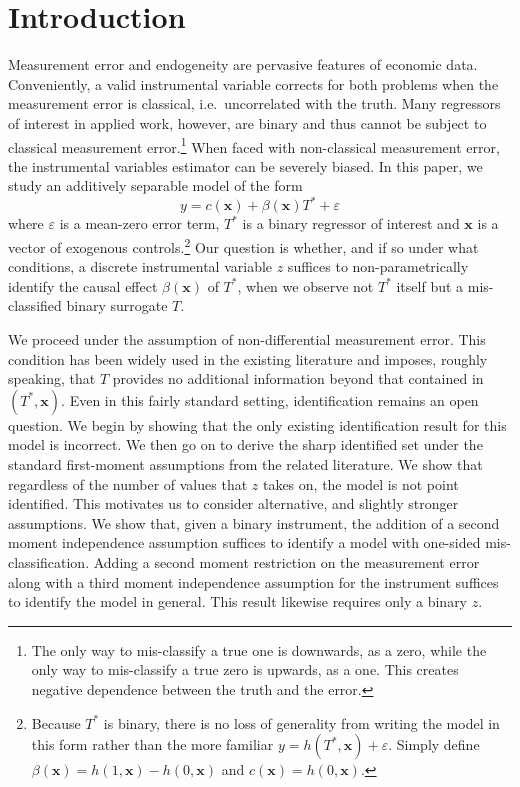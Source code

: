 \section{Introduction}

Measurement error and endogeneity are pervasive features of economic data.
Conveniently, a valid instrumental variable corrects for both problems when the measurement error is classical, i.e.\ uncorrelated with the truth.
Many regressors of interest in applied work, however, are binary and thus cannot be subject to classical measurement error.\footnote{The only way to mis-classify a true one is downwards, as a zero, while the only way to mis-classify a true zero is upwards, as a one. This creates negative dependence between the truth and the error.}
When faced with non-classical measurement error, the instrumental variables estimator can be severely biased.
In this paper, we study an additively separable model of the form
\begin{equation}
  y = c(\mathbf{x}) + \beta(\mathbf{x}) T^* + \varepsilon
  \label{eq:model}
\end{equation}
where $\varepsilon$ is a mean-zero error term, $T^*$ is a binary regressor of interest and $\mathbf{x}$ is a vector of exogenous controls.\footnote{Because $T^*$ is binary, there is no loss of generality from writing the model in this form rather than the more familiar $y = h(T^*,\mathbf{x})+\varepsilon$. Simply define $\beta(\mathbf{x}) = h(1,\mathbf{x}) - h(0,\mathbf{x})$ and $c(\mathbf{x}) = h(0,\mathbf{x})$.}
Our question is whether, and if so under what conditions, a discrete instrumental variable $z$ suffices to non-parametrically identify the causal effect $\beta(\mathbf{x})$ of $T^*$, when we observe not $T^*$ itself but a mis-classified binary surrogate $T$. 

We proceed under the assumption of non-differential measurement error.
This condition has been widely used in the existing literature and imposes, roughly speaking, that $T$ provides no additional information beyond that contained in $(T^*,\mathbf{x})$.
Even in this fairly standard setting, identification remains an open question.
We begin by showing that the only existing identification result for this model is incorrect.
We then go on to derive the sharp identified set under the standard first-moment assumptions from the related literature.
We show that regardless of the number of values that $z$ takes on, the model is not point identified.
This motivates us to consider alternative, and slightly stronger assumptions.
We show that, given a binary instrument, the addition of a second moment independence assumption suffices to identify a model with one-sided mis-classification.
Adding a second moment restriction on the measurement error along with a third moment independence assumption for the instrument suffices to identify the model in general.
This result likewise requires only a binary $z$.

